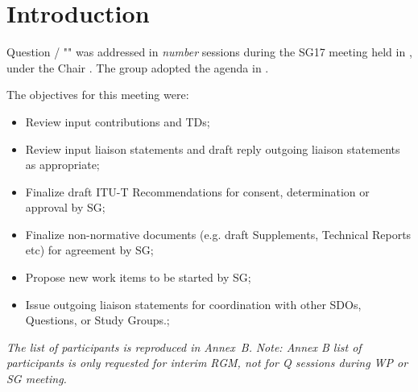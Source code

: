 
\section{Introduction}\label{introduction}



Question {\questions}/{\studyGroup} "{\questionTitle}" was addressed in \textit{number} sessions during the SG17 meeting held in {\place}, {\occurence} under the Chair {\leadership}\assistedBy. The group adopted the agenda in {\agendaRef}.

The objectives for this meeting were:
\begin{itemize}
    \item Review input contributions and TDs; 
    \item Review input liaison statements and draft reply outgoing liaison statements as appropriate; 
    \item Finalize draft ITU-T Recommendations for consent, determination or approval by SG{\studyGroup}; 
    \item Finalize non-normative documents (e.g. draft Supplements, Technical Reports etc) for agreement by SG{\studyGroup}; 
    \item Propose new work items to be started by SG{\studyGroup};
    \item Issue outgoing liaison statements for coordination with other SDOs, Questions, or Study Groups.; 
\end{itemize}


\textit{The list of participants is reproduced in Annex~B.}
\textit{Note: Annex B list of participants is only requested for interim RGM, not for Q sessions during WP or SG meeting.}
